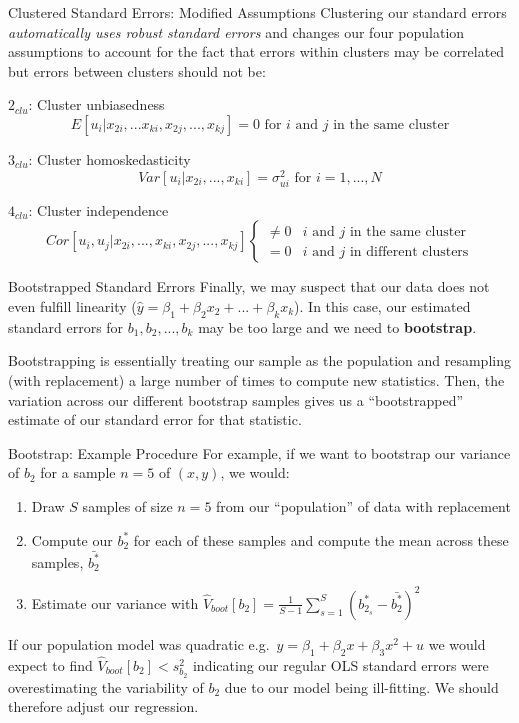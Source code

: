 \documentclass[
  ignorenonframetext,
  english,
]{beamer}
\begin{document}
\begin{frame}{Clustered Standard Errors: Modified Assumptions}
\protect{}\label{clustered-standard-errors-modified-assumptions}
Clustering our standard errors \emph{automatically uses robust standard
errors} and changes our four population assumptions to account for the
fact that errors within clusters may be correlated but errors between
clusters should not be:

\(2_{clu}\): Cluster unbiasedness
\[E[u_i|x_{2i},...x_{ki},x_{2j},...,x_{kj}]=0\text{ for }i\text{ and }j\text{ in the same cluster}\]

\(3_{clu}\): Cluster homoskedasticity
\[Var[u_i|x_{2i},...,x_{ki}]=\sigma^2_{ui}\text{ for }i=1,...,N\]

\(4_{clu}\): Cluster independence
\[Cor[u_i,u_j|x_{2i},...,x_{ki},x_{2j},...,x_{kj}]
\begin{cases}
\neq 0 & i\text{ and }j\text{ in the same cluster}\\
= 0 & i\text{ and }j\text{ in different clusters}
\end{cases}\]
\end{frame}

\begin{frame}{Bootstrapped Standard Errors}
\protect{}\label{bootstrapped-standard-errors}
Finally, we may suspect that our data does not even fulfill linearity
(\(\hat{y}=\beta_1+\beta_2x_2+...+\beta_kx_k\)). In this case, our
estimated standard errors for \(b_1,b_2,...,b_k\) may be too large and
we need to \textbf{bootstrap}.

Bootstrapping is essentially treating our sample as the population and
resampling (with replacement) a large number of times to compute new
statistics. Then, the variation across our different bootstrap samples
gives us a ``bootstrapped'' estimate of our standard error for that
statistic.
\end{frame}

\begin{frame}{Bootstrap: Example Procedure}
\protect{}\label{bootstrap-example-procedure}
For example, if we want to bootstrap our variance of \(b_2\) for a
sample \(n=5\) of \((x,y)\), we would:

\begin{enumerate}
\item
  Draw \(S\) samples of size \(n=5\) from our ``population'' of data
  with replacement
\item
  Compute our \(b_2^*\) for each of these samples and compute the mean
  across these samples, \(\bar{b_2^*}\)
\item
  Estimate our variance with
  \(\hat{V}_{boot}[b_2]=\frac{1}{S-1}\sum_{s=1}^S\left(b_{2_s}^*-\bar{b_2^*}\right)^2\)
\end{enumerate}

If our population model was quadratic
e.g.~\(y=\beta_1+\beta_2x+\beta_3x^2+u\) we would expect to find
\(\hat{V}_{boot}[b_2]<s^2_{b_2}\) indicating our regular OLS standard
errors were overestimating the variability of \(b_2\) due to our model
being ill-fitting. We should therefore adjust our regression.
\end{frame}
\end{document}
